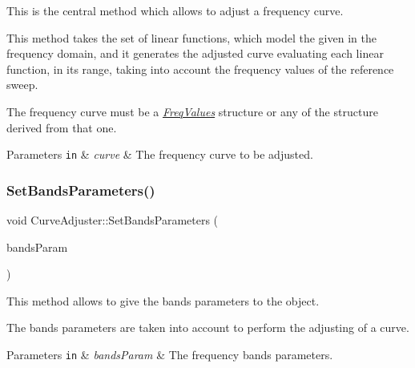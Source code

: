 This is the central method which allows to adjust a frequency curve. 

This method takes the set of linear functions, which model the given in the frequency domain, and it generates the adjusted curve evaluating each linear function, in its range, taking into account the frequency values of the reference sweep.

The frequency curve must be a {\itshape \hyperlink{structFreqValues}{Freq\+Values}} structure or any of the structure derived from that one. 
\begin{DoxyParams}[1]{Parameters}
\mbox{\tt in}  & {\em curve} & The frequency curve to be adjusted. \\
\hline
\end{DoxyParams}
\mbox{\label{classCurveAdjuster_a17080bae5109c5128caa4c214b856e19}} 
\subsubsection{\texorpdfstring{Set\+Bands\+Parameters()}{SetBandsParameters()}}
{\footnotesize\ttfamily void Curve\+Adjuster\+::\+Set\+Bands\+Parameters (\begin{DoxyParamCaption}\item[{const std\+::vector$<$ \hyperlink{structBandParameters}{Band\+Parameters} $>$ \&}]{bands\+Param }\end{DoxyParamCaption})\hspace{0.3cm}{\ttfamily [inline]}}



This method allows to give the bands\textquotesingle{} parameters to the object. 

The bands\textquotesingle{} parameters are taken into account to perform the adjusting of a curve. 
\begin{DoxyParams}[1]{Parameters}
\mbox{\tt in}  & {\em bands\+Param} & The frequency bands\textquotesingle{} parameters. \\
\hline
\end{DoxyParams}
\mbox{\label{classCurveAdjuster_a5865916cf99ab2cad0a7a9bc2b4e1d56}} 
